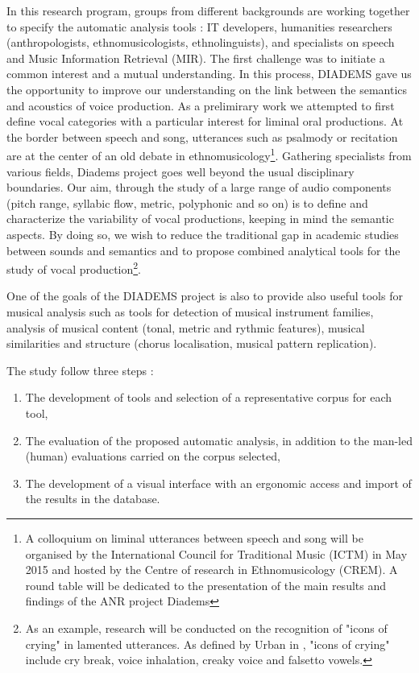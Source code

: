 \documentclass{sig-alternate}
\begin{document}
In this research program, groups from different backgrounds are working together to specify the automatic analysis tools :  IT developers, humanities researchers (anthropologists, ethnomusicologists, ethnolinguists), and specialists on speech and Music Information Retrieval (MIR). The first challenge was to initiate a common interest and a mutual understanding. In this process, DIADEMS gave us the opportunity  to improve our understanding on the link between the semantics and acoustics of voice production. As a prelimirary work we attempted to first define vocal categories with a particular interest for liminal oral productions. At the border between speech and song, utterances such as psalmody or recitation are at the center of an old debate in ethnomusicology\footnote{A colloquium on liminal utterances between speech and song will be organised by the International Council for Traditional Music (ICTM) in May 2015 and hosted by the Centre of research in Ethnomusicology (CREM). A round table will be dedicated to the presentation of the main results and findings of the ANR project Diadems}. Gathering specialists from various fields, Diadems project goes well beyond the usual disciplinary boundaries. Our aim, through the study of a large range of audio components (pitch range, syllabic flow, metric, polyphonic and so on) is to define and characterize the variability of vocal productions, keeping in mind the semantic aspects. By doing so, we wish to reduce the traditional gap in academic studies between sounds and semantics and to propose combined analytical tools for the study of vocal production\footnote{As an example, research will be conducted on the recognition of "icons of crying" 
in lamented utterances. As defined by Urban in \cite{Urban88}, "icons of crying" include cry break, voice inhalation, creaky voice and falsetto vowels.}. 

One of the goals of the DIADEMS project is also to provide also useful tools for musical analysis such as tools for detection of musical instrument families, analysis of musical content (tonal, metric and rythmic features), musical similarities and structure (chorus localisation, musical pattern replication).

The study follow three steps : 
\begin{enumerate}
\item The development of tools and selection of a representative corpus
  for each tool,
\item The evaluation of the proposed automatic analysis, in addition to
  the man-led (human) evaluations carried on the corpus selected,
\item The development of a visual interface with an ergonomic access and
  import of the results in the database.
\end{enumerate}
\end{document}
